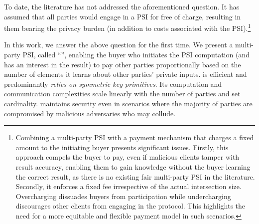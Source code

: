 To date, the literature has not addressed the aforementioned question. It has assumed that all parties would engage in a PSI for free of charge, resulting in them bearing the privacy burden (in addition to costs associated with the PSI).\footnote{Combining a multi-party PSI with a payment mechanism that charges a fixed amount to the initiating buyer presents significant issues. Firstly, this approach compels the buyer to pay, even if malicious clients tamper with result accuracy, enabling them to gain knowledge without the buyer learning the correct result, as there is no existing fair multi-party PSI in the literature. Secondly, it enforces a fixed fee irrespective of the actual intersection size. Overcharging dissuades buyers from participation while undercharging discourages other clients from engaging in the protocol. This highlights the need for a more equitable and flexible payment model in such scenarios.}


%
In this work, we answer the above question for the first time. We present a multi-party PSI, called ``\withRew'', enabling the buyer who initiates the PSI computation (and has an interest in the result) to pay other parties proportionally based on the number of elements it learns about other parties' private inputs. 
%
%
\withRew is efficient and predominantly \emph{relies on symmetric key primitives}.  Its computation and communication complexities  scale linearly with  the number of parties and set cardinality. \withRew maintains security even in scenarios where the majority of parties are compromised by malicious adversaries who may collude.




